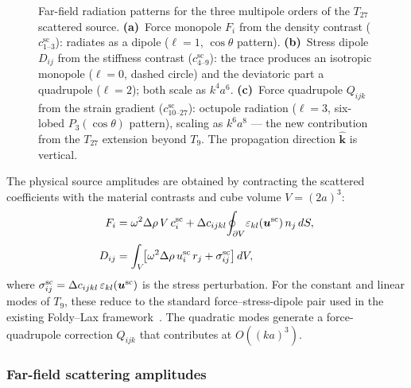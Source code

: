 \begin{figure}[ht]
\caption{Far-field radiation patterns for the three multipole orders
of the $T_{27}$ scattered source.
\textbf{(a)}~Force monopole $F_i$ from the density contrast
($c^\mathrm{sc}_{1\text{--}3}$): radiates as a dipole
($\ell = 1$, $\cos\theta$ pattern).
\textbf{(b)}~Stress dipole $D_{ij}$ from the stiffness contrast
($c^\mathrm{sc}_{4\text{--}9}$): the trace produces an isotropic
monopole ($\ell = 0$, dashed circle) and the deviatoric part a
quadrupole ($\ell = 2$); both scale as $k^4 a^6$.
\textbf{(c)}~Force quadrupole $Q_{ijk}$ from the strain gradient
($c^\mathrm{sc}_{10\text{--}27}$): octupole radiation ($\ell = 3$,
six-lobed $P_3(\cos\theta)$ pattern), scaling as $k^6 a^8$ ---
the new contribution from the $T_{27}$ extension beyond $T_9$.
The propagation direction $\hat{\bm{k}}$ is vertical.}
\label{fig:multipoles}
\end{figure}

The physical source amplitudes are obtained by contracting the scattered
coefficients with the material contrasts and cube volume $V = (2a)^3$:
\begin{align}
  F_i &= \omega^2\Delta\rho\,V\,c^{\mathrm{sc}}_i
    + \Delta c_{ijkl}\!\oint_{\partial V}\!
    \varepsilon_{kl}(\bm{u}^{\mathrm{sc}})\,n_j\,dS,
    \label{eq:force-monopole}\\[3pt]
  D_{ij} &= \int_V\!\bigl[
    \omega^2\Delta\rho\,u^{\mathrm{sc}}_i\,r_j
    + \sigma^{\mathrm{sc}}_{ij}\bigr]\,dV,
    \label{eq:stress-dipole}
\end{align}
where $\sigma^{\mathrm{sc}}_{ij} = \Delta c_{ijkl}\,\varepsilon_{kl}(\bm{u}^{\mathrm{sc}})$
is the stress perturbation.  For the constant and linear modes of $T_9$,
these reduce to the standard force--stress-dipole pair used in the
existing Foldy--Lax framework~\cite{mura1987}.  The quadratic modes
generate a force-quadrupole correction $Q_{ijk}$ that contributes at
$O((ka)^3)$.

\subsubsection{Far-field scattering amplitudes}
\label{sec:far-field}

